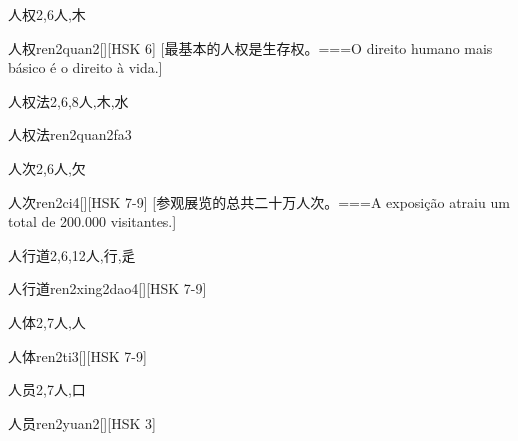 \begin{Entry}{人权}{2,6}{⼈,⽊}
  \begin{Phonetics}{人权}{ren2quan2}[][HSK 6]
    [最基本的人权是生存权。===O direito humano mais básico é o direito à vida.]
  \end{Phonetics}
\end{Entry}

\begin{Entry}{人权法}{2,6,8}{⼈,⽊,⽔}
  \begin{Phonetics}{人权法}{ren2quan2fa3}
  \end{Phonetics}
\end{Entry}

\begin{Entry}{人次}{2,6}{⼈,⽋}
  \begin{Phonetics}{人次}{ren2ci4}[][HSK 7-9]
    [参观展览的总共二十万人次。===A exposição atraiu um total de 200.000 visitantes.]
  \end{Phonetics}
\end{Entry}

\begin{Entry}{人行道}{2,6,12}{⼈,⾏,⾡}
  \begin{Phonetics}{人行道}{ren2xing2dao4}[][HSK 7-9]
  \end{Phonetics}
\end{Entry}

\begin{Entry}{人体}{2,7}{⼈,⼈}
  \begin{Phonetics}{人体}{ren2ti3}[][HSK 7-9]
  \end{Phonetics}
\end{Entry}

\begin{Entry}{人员}{2,7}{⼈,⼝}
  \begin{Phonetics}{人员}{ren2yuan2}[][HSK 3]
  \end{Phonetics}
\end{Entry}

